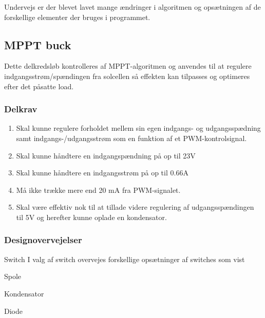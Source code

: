 \documentclass[../main.tex]{subfiles}
\begin{document}
    Undervejs er der blevet lavet mange ændringer i algoritmen og opsætningen af de forskellige elementer der bruges i programmet. 


    \subsection{MPPT buck}
        Dette delkredsløb kontrolleres af MPPT-algoritmen og anvendes til at regulere indgangsstrøm/spændingen fra solcellen så effekten kan tilpasses og optimeres efter det påsatte load.
        
        \subsubsection{Delkrav}

            \begin{enumerate}
                \item Skal kunne regulere forholdet mellem sin egen indgangs- og udgangsspædning samt indgangs-/udgangsstrøm som en funktion af et PWM-kontrolsignal.
                \item Skal kunne håndtere en indgangspændning på op til 23V
                \item Skal kunne håndtere en indgangsstrøm på op til 0.66A
                \item Må ikke trække mere end 20 mA fra PWM-signalet.
                \item Skal være effektiv nok til at tillade videre regulering af udgangsspændingen til 5V og herefter kunne oplade en kondensator.
            \end{enumerate}
            
        \subsubsection{Designovervejelser}
            
            Switch
            I valg af switch overvejes forskellige opsætninger af switches som vist 
            
            
            Spole
            
            
            
            Kondensator
            
            
            
            Diode
            
            
            
            
\end{document}
